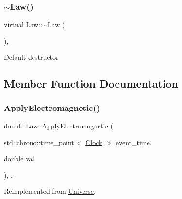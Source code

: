 \mbox{\label{classLaw_a4fa6f0fb61285152c8c6d7a17b51a82b}} 
\subsubsection{\texorpdfstring{$\sim$\+Law()}{~Law()}}
{\footnotesize\ttfamily virtual Law\+::$\sim$\+Law (\begin{DoxyParamCaption}{ }\end{DoxyParamCaption})\hspace{0.3cm}{\ttfamily [inline]}, {\ttfamily [virtual]}}

Default destructor 

\subsection{Member Function Documentation}
\mbox{\label{classLaw_a418791aee2a9204a99d3a917b86fafd3}} 
\subsubsection{\texorpdfstring{Apply\+Electromagnetic()}{ApplyElectromagnetic()}}
{\footnotesize\ttfamily double Law\+::\+Apply\+Electromagnetic (\begin{DoxyParamCaption}\item[{std\+::chrono\+::time\+\_\+point$<$ \mbox{\hyperlink{universe_8h_a0ef8d951d1ca5ab3cfaf7ab4c7a6fd80}{Clock}} $>$}]{event\+\_\+time,  }\item[{double}]{val }\end{DoxyParamCaption})\hspace{0.3cm}{\ttfamily [inline]}, {\ttfamily [final]}, {\ttfamily [virtual]}}



Reimplemented from \mbox{\hyperlink{classUniverse_a1f787da78fa196ba635db21a9e91dabb}{Universe}}.

\mbox{\label{classLaw_a4485046db890a95cea16573042a4f4f6}} 
